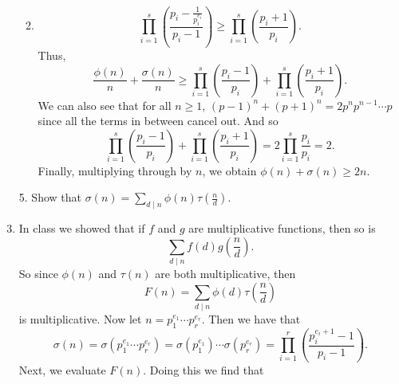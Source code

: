 \documentclass[12pt]{article}
\makeatletter
\theoremstyle{definition}
\theoremstyle{remark}
\renewenvironment{proof}[1][\proofname]{\par
  \pushQED{\qed}%
  \normalfont \topsep6\p@\@plus6\p@\relax
  \list{}{\leftmargin=0mm
          \rightmargin=4mm
          \settowidth{\itemindent}{\itshape#1}%
          \labelwidth=\itemindent
          \parsep=0pt \listparindent=\parindent 
  }
  \item[\hskip\labelsep
        \itshape
    #1\@addpunct{.}]\ignorespaces
}{%
  \popQED\endlist\@endpefalse
}
\let\oldproofname=\proofname
\renewcommand{\proofname}{\bf{\textit{\oldproofname}}}
\makeatother
\begin{document}
\begin{enumerate}[leftmargin=*]
\begin{enumerate}
\begin{proof}
\begin{equation*}
                                \prod_{i=1}^s\left(\frac{p_i-\frac{1}{p_i^{e_i}}}{p_i-1}\right)\geq \prod_{i=1}^s\left(\frac{p_i+1}{p_i}\right).
                            \end{equation*}
                        Thus,
                            \begin{equation*}
                                \frac{\phi(n)}{n}+\frac{\sigma(n)}{n}\geq\prod_{i=1}^s\left(\frac{p_i-1}{p_i}\right)+\prod_{i=1}^s\left(\frac{p_i+1}{p_i}\right).
                            \end{equation*}
                        We can also see that for all $n\geq 1$, $(p-1)^n+(p+1)^n=2p^np^{n-1}\cdots p$ since all the terms in between cancel out. And so 
                            \begin{equation*}
                                \prod_{i=1}^s\left(\frac{p_i-1}{p_i}\right)+\prod_{i=1}^s\left(\frac{p_i+1}{p_i}\right)=2\prod_{i=1}^s\frac{p_i}{p_i}=2.
                            \end{equation*}
                        Finally, multiplying through by $n$, we obtain $\phi(n)+\sigma(n)\geq 2n$.
                    \end{proof}
            \end{enumerate}
        \item[5.] Show that $\sigma(n)=\sum_{d\mid n}\phi(n)\tau(\frac{n}{d})$.
            \begin{proof}
                In class we showed that if $f$ and $g$ are multiplicative functions, then so is 
                    \begin{equation*}
                        \sum_{d\mid n}f(d)g(\frac{n}{d}).
                    \end{equation*}
                So since $\phi(n)$ and $\tau(n)$ are both multiplicative, then 
                    \begin{equation*}
                        F(n)=\sum_{d\mid n}\phi(d)\tau(\frac{n}{d})
                    \end{equation*}
                is multiplicative. Now let $n=p_1^{e_1}\cdots p_r^{e_r}$. Then we have that 
                    \begin{equation*}
                        \sigma(n)=\sigma(p_1^{e_1}\cdots p_r^{e_r})=\sigma(p_1^{e_1})\cdots\sigma(p_r^{e_r})=\prod_{i=1}^r\left(\frac{p_i^{e_i+1}-1}{p_i-1}\right).
                    \end{equation*}
                Next, we evaluate $F(n)$. Doing this we find that \newpage
                    \begin{equation*}

\end{equation*}
\end{proof}
\end{enumerate}
\end{document}
